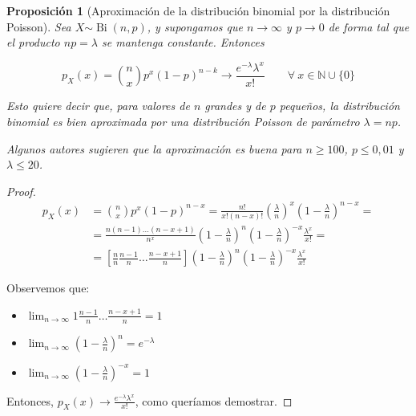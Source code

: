 \documentclass[11pt]{article}
\theoremstyle{plain}
\newtheorem*{pro}{Proposición}
\theoremstyle{definition}
\theoremstyle{remark}
\newcommand{\foralle}{\ensuremath{\forall \ }}  %
\newcommand{\dist}[1]{\ensuremath{\sim \operatorname{#1}}}  %
\begin{document}
      \begin{pro} [Aproximación de la distribución binomial por la distribución Poisson]
        Sea $X \dist{Bi}(n,p)$, y supongamos que $n \to \infty$ y $p \to 0$ de forma tal que el producto $np = \lambda$ se mantenga constante. Entonces

        \[ p_X (x) = \binom{n}{x} p^x (1 - p)^{n - k} \longrightarrow \frac{e^{-\lambda} \lambda^x}{x!} \qquad \foralle x \in \mathbb{N} \cup \lbrace 0 \rbrace \]

        Esto quiere decir que, para valores de $n$ grandes y de $p$ pequeños, la distribución binomial es bien aproximada por una distribución Poisson de parámetro $\lambda = np$.

        Algunos autores sugieren que la aproximación es buena para $n \geq 100$, $p \leq 0,01$ y $\lambda \leq 20$.
      \end{pro}
      \begin{proof}
        \[ \begin{split}
          p_X(x) &= \binom{n}{x} p^x (1 - p)^{n - x} = \frac{n!}{x! (n - x)!} \left( \frac{\lambda}{n} \right)^x \left( 1 - \frac{\lambda}{n} \right)^{n - x} = \\
          &= \frac{n (n-1) \dots (n - x + 1)}{n^x} \left( 1 - \frac{\lambda}{n} \right)^n \left( 1 - \frac{\lambda}{n} \right)^{-x} \frac{\lambda^x}{x!} = \\
          &= \left[ \frac{n}{n} \frac{n - 1}{n} \dots \frac{n - x + 1 }{n} \right] \left( 1 - \frac{\lambda}{n} \right)^n \left( 1 - \frac{\lambda}{n} \right)^{-x} \frac{\lambda^x}{x!}
        \end{split} \]

        Observemos que:
        \begin{itemize}
          \item $\displaystyle \lim_{n \to \infty} 1 \frac{n - 1}{n} \dots \frac{n - x +1}{n} = 1$
          \item $\displaystyle \lim_{n \to \infty} \left( 1 - \frac{\lambda}{n} \right)^n = e^{-\lambda}$
          \item $\displaystyle \lim_{n \to \infty} \left( 1 - \frac{\lambda}{n} \right)^{-x} = 1$
        \end{itemize}

        Entonces, $p_X(x) \longrightarrow \frac{e^{-\lambda} \lambda^x}{x!}$, como queríamos demostrar.
      \end{proof}
\end{document}
